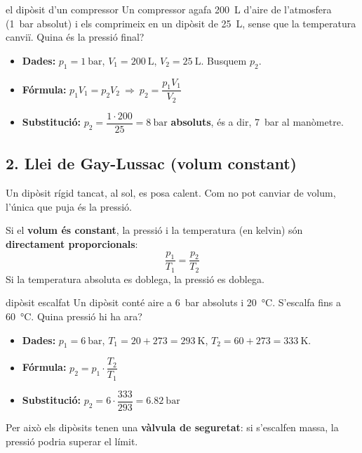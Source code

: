\begin{exemple}{el dipòsit d'un compressor}
Un compressor agafa \SI{200}{\liter} d'aire de l'atmosfera (\SI{1}{\bar} absolut) i els comprimeix en un dipòsit de \SI{25}{\liter}, sense que la temperatura canviï. Quina és la pressió final?
\begin{itemize}
 \item \textbf{Dades:} $p_1 = \SI{1}{\bar}$, $V_1 = \SI{200}{\liter}$, $V_2 = \SI{25}{\liter}$. Busquem $p_2$.
 \item \textbf{Fórmula:} $p_1 V_1 = p_2 V_2 \ \Rightarrow\ p_2 = \dfrac{p_1 V_1}{V_2}$
 \item \textbf{Substitució:} $p_2 = \dfrac{1 \cdot 200}{25} = \SI{8}{\bar}$ \textbf{absoluts}, és a dir, \SI{7}{\bar} al manòmetre.
\end{itemize}
\end{exemple}

\subsection*{2. Llei de Gay-Lussac (volum constant)}

Un dipòsit rígid tancat, al sol, es posa calent. Com no pot canviar de volum, l'única que puja és la pressió.

\begin{idea}
Si el \textbf{volum és constant}, la pressió i la temperatura (en kelvin) són \textbf{directament proporcionals}:
\[ \frac{p_1}{T_1} = \frac{p_2}{T_2} \]
Si la temperatura absoluta es doblega, la pressió es doblega.
\end{idea}

\begin{exemple}{dipòsit escalfat}
Un dipòsit conté aire a \SI{6}{\bar} absoluts i \SI{20}{\degreeCelsius}. S'escalfa fins a \SI{60}{\degreeCelsius}. Quina pressió hi ha ara?
\begin{itemize}
 \item \textbf{Dades:} $p_1 = \SI{6}{\bar}$, $T_1 = 20 + 273 = \SI{293}{\kelvin}$, $T_2 = 60 + 273 = \SI{333}{\kelvin}$.
 \item \textbf{Fórmula:} $p_2 = p_1 \cdot \dfrac{T_2}{T_1}$
 \item \textbf{Substitució:} $p_2 = 6 \cdot \dfrac{333}{293} = \SI{6,82}{\bar}$
\end{itemize}
Per això els dipòsits tenen una \textbf{vàlvula de seguretat}: si s'escalfen massa, la pressió podria superar el límit.
\end{exemple}

